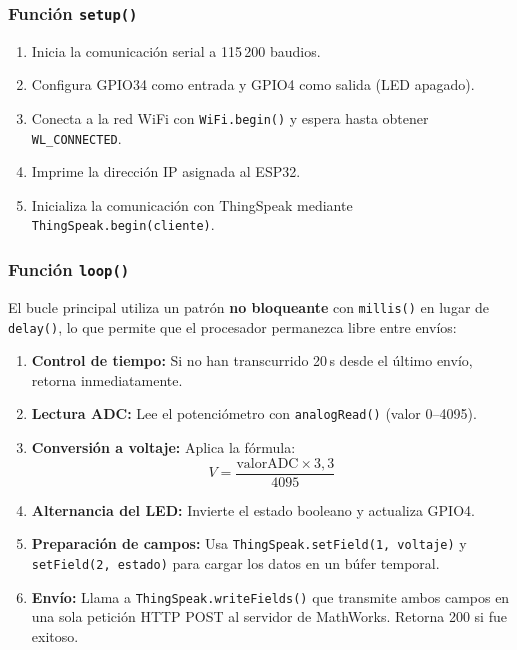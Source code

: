 \documentclass[12pt,a4paper]{article}
\begin{document}
\subsubsection*{Función \texttt{setup()}}

\begin{enumerate}
    \item Inicia la comunicación serial a 115\,200 baudios.
    \item Configura GPIO34 como entrada y GPIO4 como salida (LED apagado).
    \item Conecta a la red WiFi con \texttt{WiFi.begin()} y espera hasta obtener \texttt{WL\_CONNECTED}.
    \item Imprime la dirección IP asignada al ESP32.
    \item Inicializa la comunicación con ThingSpeak mediante \texttt{ThingSpeak.begin(cliente)}.
\end{enumerate}

\subsubsection*{Función \texttt{loop()}}

El bucle principal utiliza un patrón \textbf{no bloqueante} con \texttt{millis()} en lugar de \texttt{delay()}, lo que permite que el procesador permanezca libre entre envíos:

\begin{enumerate}
    \item \textbf{Control de tiempo:} Si no han transcurrido 20\,s desde el último envío, retorna inmediatamente.
    \item \textbf{Lectura ADC:} Lee el potenciómetro con \texttt{analogRead()} (valor 0--4095).
    \item \textbf{Conversión a voltaje:} Aplica la fórmula:
    \begin{equation}
    V = \frac{\text{valorADC} \times 3{,}3}{4095}
    \label{eq:voltaje}
    \end{equation}
    \item \textbf{Alternancia del LED:} Invierte el estado booleano y actualiza GPIO4.
    \item \textbf{Preparación de campos:} Usa \texttt{ThingSpeak.setField(1, voltaje)} y \texttt{setField(2, estado)} para cargar los datos en un búfer temporal.
    \item \textbf{Envío:} Llama a \texttt{ThingSpeak.writeFields()} que transmite ambos campos en una sola petición HTTP POST al servidor de MathWorks. Retorna 200 si fue exitoso.
\end{enumerate}
\end{document}
